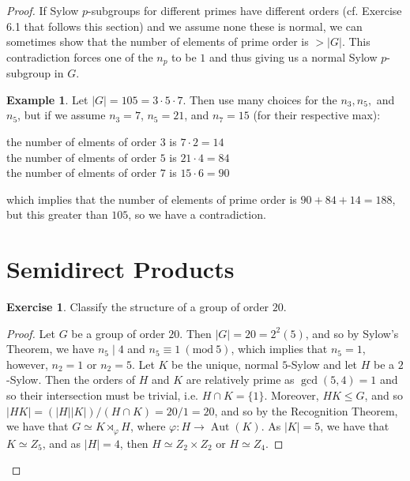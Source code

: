 \documentclass[9pt,reqno]{amsart}
\theoremstyle{definition}
\newtheorem{exercise}{Exercise}[section]
\newtheorem{ex}{Example}[section]
\DeclareMathOperator{\aut}{Aut}
\newcommand{\Mod}[1]{\ (\mathrm{mod}\ #1)}
\begin{document}
\begin{proof}
If Sylow $p$-subgroups for different primes have different orders (cf. Exercise 6.1 that follows this section) and we assume none these is normal, we can sometimes show that the number of elements of prime order is $> |G|$. This contradiction forces one of the $n_p$ to be $1$ and thus giving us a normal Sylow $p$-subgroup in $G$. 
\begin{ex}
Let $|G| = 105 = 3 \cdot 5 \cdot 7$. Then use many choices for the $n_3, n_5,$ and $n_5$, but if we assume $n_3 = 7$, $n_5 = 21$, and $n_7 =15$ (for their respective max): 
\begin{center}
the number of elments of order $3$ is $7 \cdot 2 = 14$ \\
the number of elments of order $5$ is $21 \cdot 4 = 84$ \\
the number of elments of order $7$ is $15 \cdot 6 = 90$ 
\end{center}
	which implies that the number of elements of prime order is $90 + 84 + 14 = 188$, but this greater than $ 105$, so we have a contradiction. 
	\end{ex}

\section{Semidirect Products}
\begin{exercise}
	Classify the structure of a group of order $20$.
\end{exercise}
\begin{proof}
	Let $G$ be a group of order $20$. Then $|G| = 20 = 2^2 (5)$, and so by Sylow's Theorem, we have $n_5 \mid 4$ and $n_5 \equiv 1 \Mod{5}$, which implies that $n_5 = 1$, however, $n_2 = 1$ or $n_2 = 5$. Let $K$ be the unique, normal $5$-Sylow and let $H$ be a $2$-Sylow. Then the orders of $H$ and $K$ are relatively prime as $\gcd (5, 4) = 1$ and so their intersection must be trivial, i.e. $H \cap K = \{1 \}$. Moreover, $HK \leq G$, and so $|HK| = (|H| |K|)/ (H\cap K) = 20/ 1 = 20$, and so by the Recognition Theorem, we have that $G \simeq K \rtimes_\varphi H$, where $\varphi \colon H \to \aut (K)$. As $|K| =5$, we have that $K \simeq Z_5$, and as $|H| = 4$, then $H \simeq Z_2 \times Z_2 $ or $H \simeq Z_4$. 
	

\end{proof}
\end{proof}
\end{document}
